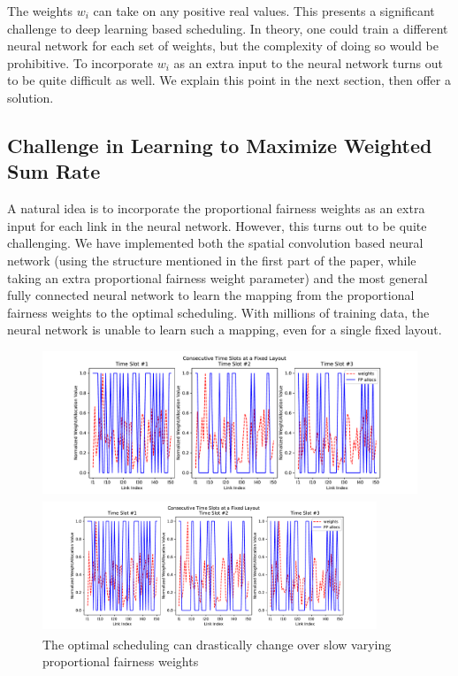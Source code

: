 \documentclass[journal,12pt,onecolumn,draftclsnofoot,]{IEEEtran}
\begin{document}
The weights $w_i$ can take on any positive real values. This presents a
significant challenge to deep learning based scheduling. In theory, one could
train a different neural network for each set of weights, but the complexity of
doing so would be prohibitive. To incorporate $w_i$ as an extra input to the neural
network turns out to be quite difficult as well. We explain this point in the
next section, then offer a solution. 


\subsection{Challenge in Learning to Maximize Weighted Sum Rate}

A natural idea is to incorporate the proportional fairness weights as an extra
input for each link in the neural network. However, this turns out to be quite
challenging. We have implemented both the spatial convolution based neural network (using
the structure mentioned in the first part of the paper, while taking an extra
proportional fairness weight parameter) and the most general fully connected neural
network to learn the mapping from the proportional fairness weights to the
optimal scheduling. With millions of training data, the neural network is
unable to learn such a mapping, even for a single fixed layout. 

\begin{figure}
\centering
\ifOneColumn
    \centerline{\includegraphics[width=13.5cm]{fig/Weights_FPAllocs}}
\else
    \centerline{\includegraphics[width=10cm,height=4cm]{fig/Weights_FPAllocs}}
\fi
\caption{The optimal scheduling can drastically change over slow varying
proportional fairness weights}
\label{fig:weights_allocs}
\end{figure}
\end{document}
